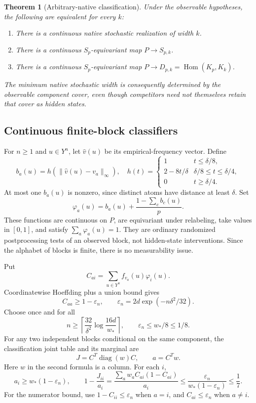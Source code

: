 \documentclass[11pt]{article}
\newtheorem{theorem}{Theorem}
\theoremstyle{remark}\newtheorem{remark}[theorem]{Remark}
\newcommand{\diag}{\operatorname{diag}}
\newcommand{\eps}{\varepsilon}
\newcommand{\Hom}{\operatorname{Hom}}
\begin{document}
\begin{theorem}[Arbitrary-native classification]\label{thm:width}
Under the observable hypotheses, the following are equivalent for every $k$:
\begin{enumerate}
\item There is a continuous native stochastic realization of width $k$.
\item There is a continuous $S_p$-equivariant map $P\to S_{p,k}$.
\item There is a continuous $S_p$-equivariant map $P\to D_{p,k}=\Hom(K_p,K_k)$.
\end{enumerate}
The minimum native stochastic width is consequently determined by the observable component cover, even though competitors need not themselves retain that cover as hidden states.
\end{theorem}

\subsection{Continuous finite-block classifiers}
For $n\geq1$ and $u\in Y^n$, let $\widehat v(u)$ be its empirical-frequency vector. Define
\[
 b_a(u)=h(\|\widehat v(u)-v_a\|_\infty),\quad
 h(t)=\begin{cases}1&t\leq\delta/8,\\2-8t/\delta&\delta/8\leq t\leq\delta/4,\\0&t\geq\delta/4.\end{cases}
\]
At most one $b_a(u)$ is nonzero, since distinct atoms have distance at least $\delta$. Set
\[
 \varphi_a(u)=b_a(u)+\frac{1-\sum_cb_c(u)}p.
\]
These functions are continuous on $P$, are equivariant under relabeling, take values in $[0,1]$, and satisfy $\sum_a\varphi_a(u)=1$. They are ordinary randomized postprocessing tests of an observed block, not hidden-state interventions. Since the alphabet of blocks is finite, there is no measurability issue.

Put
\[
 C_{ai}=\sum_{u\in Y^n}f_{v_a}(u)\varphi_i(u).
\]
Coordinatewise Hoeffding plus a union bound gives
\[
 C_{aa}\geq1-\eps_n,\qquad
 \eps_n=2d\exp(-n\delta^2/32).
\]
Choose once and for all
\begin{equation}\label{eq:n}
 n\geq\left\lceil\frac{32}{\delta^2}\log\frac{16d}{w_*}\right\rceil,
 \qquad \eps_n\leq w_*/8\leq1/8.
\end{equation}
For any two independent blocks conditional on the same component, the classification joint table and its marginal are
\[
 J=C^T\diag(w)C,\qquad a=C^Tw.
\]
Here $w$ in the second formula is a column. For each $i$,
\[
 a_i\geq w_*(1-\eps_n),\qquad
 1-\frac{J_{ii}}{a_i}
 =\frac{\sum_aw_aC_{ai}(1-C_{ai})}{a_i}
 \leq\frac{\eps_n}{w_*(1-\eps_n)}\leq\frac17.
\]
For the numerator bound, use $1-C_{ii}\leq\eps_n$ when $a=i$, and $C_{ai}\leq\eps_n$ when $a\ne i$.
\end{document}
